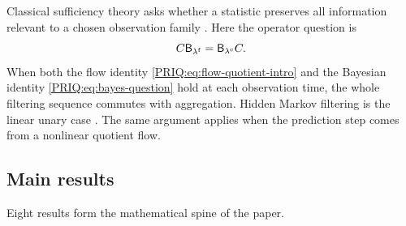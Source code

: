 Classical sufficiency theory asks whether a statistic preserves all information relevant to a chosen observation family \cite{PRIQ:HalmosSavage1949,PRIQ:Blackwell1953}.  Here the operator question is
\begin{equation}\label{PRIQ:eq:bayes-question}
  C\mathsf B_{\lambda^{\mathrm f}}
  =
  \mathsf B_{\lambda^{\mathrm c}}C.
\end{equation}
When both the flow identity \eqref{PRIQ:eq:flow-quotient-intro} and the Bayesian identity \eqref{PRIQ:eq:bayes-question} hold at each observation time, the whole filtering sequence commutes with aggregation.  Hidden Markov filtering is the linear unary case \cite{PRIQ:BaumPetrie1966}.  The same argument applies when the prediction step comes from a nonlinear quotient flow.

\subsection{Main results}
Eight results form the mathematical spine of the paper.

